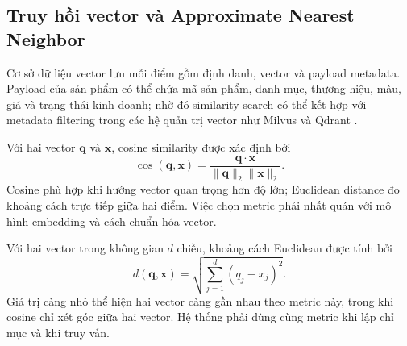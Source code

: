 
\subsection{Truy hồi vector và Approximate Nearest Neighbor}

Cơ sở dữ liệu vector lưu mỗi điểm gồm định danh, vector và payload metadata. Payload của
sản phẩm có thể chứa mã sản phẩm, danh mục, thương hiệu, màu, giá và trạng thái kinh
doanh; nhờ đó similarity search có thể kết hợp với metadata filtering trong các hệ
quản trị vector như Milvus và Qdrant \parencite{wang2021milvus,qdrant2024vectorsimilarity}.

Với hai vector $\mathbf q$ và $\mathbf x$, cosine similarity được xác định bởi
\begin{equation}
    \operatorname{cos}(\mathbf q,\mathbf x)=
    \frac{\mathbf q\cdot\mathbf x}
    {\lVert\mathbf q\rVert_2\lVert\mathbf x\rVert_2}.
    \label{eq:cosine_similarity}
\end{equation}
Cosine phù hợp khi hướng vector quan trọng hơn độ lớn; Euclidean distance đo khoảng cách
trực tiếp giữa hai điểm. Việc chọn metric phải nhất quán với mô hình embedding và cách
chuẩn hóa vector.

Với hai vector trong không gian $d$ chiều, khoảng cách Euclidean được tính bởi
\begin{equation}
    d(\mathbf q,\mathbf x)=
    \sqrt{\sum_{j=1}^{d}(q_j-x_j)^2}.
    \label{eq:euclidean_distance}
\end{equation}
Giá trị càng nhỏ thể hiện hai vector càng gần nhau theo metric này, trong khi cosine
chỉ xét góc giữa hai vector. Hệ thống phải dùng cùng metric khi lập chỉ mục và khi truy vấn.

